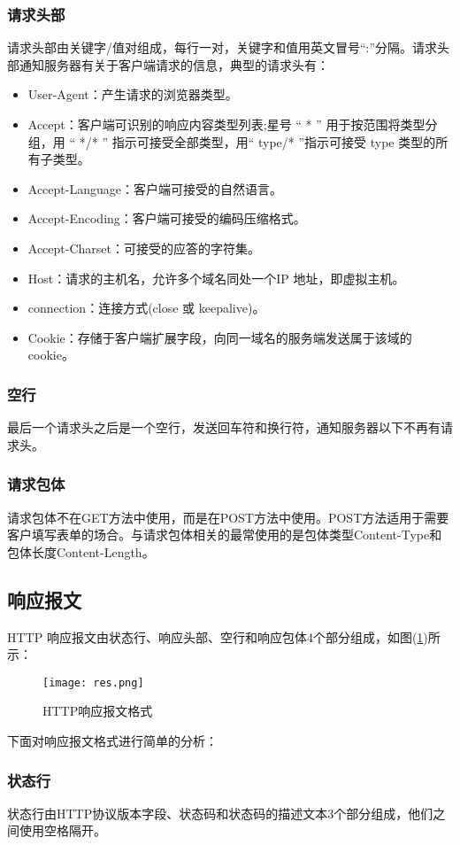 \documentclass[bachelor]{thesis-uestc}
\begin{document}
\subsubsection*{请求头部}
请求头部由关键字/值对组成，每行一对，关键字和值用英文冒号“:”分隔。请求头部通知服务器有关于客户端请求的信息，典型的请求头有：
\begin{itemize}
	\item User-Agent：产生请求的浏览器类型。
	\item Accept：客户端可识别的响应内容类型列表;星号 “ * ” 用于按范围将类型分组，用 “ */* ” 指示可接受全部类型，用“ type/* ”指示可接受 type 类型的所有子类型。
	\item Accept-Language：客户端可接受的自然语言。
	\item Accept-Encoding：客户端可接受的编码压缩格式。
	\item Accept-Charset：可接受的应答的字符集。
	\item Host：请求的主机名，允许多个域名同处一个IP 地址，即虚拟主机。
	\item connection：连接方式(close 或 keepalive)。
	\item Cookie：存储于客户端扩展字段，向同一域名的服务端发送属于该域的cookie。
\end{itemize}
\subsubsection*{空行}

最后一个请求头之后是一个空行，发送回车符和换行符，通知服务器以下不再有请求头。

\subsubsection*{请求包体}

请求包体不在GET方法中使用，而是在POST方法中使用。POST方法适用于需要客户填写表单的场合。与请求包体相关的最常使用的是包体类型Content-Type和包体长度Content-Length。

\subsection{响应报文}
HTTP 响应报文由状态行、响应头部、空行和响应包体4个部分组成，如图(\ref{httpres})所示：
\begin{figure}[h]
\texttt{[image: res.png]}	
\caption{HTTP响应报文格式}
\label{httpres} 
\end{figure}

下面对响应报文格式进行简单的分析：
\subsubsection*{状态行}
状态行由HTTP协议版本字段、状态码和状态码的描述文本3个部分组成，他们之间使用空格隔开。
\end{document}
